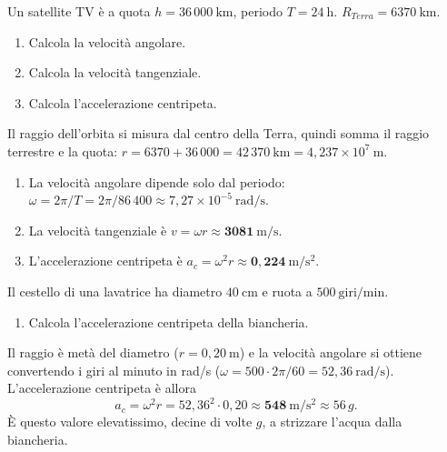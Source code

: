 \begin{question}[ID=1.6, subtitle={Satellite TV geostazionario a 36000 km di quota}, tags={moto circolare, satellite}, difficulty=media]
Un satellite TV è a quota $h = 36\,000\ \mathrm{km}$, periodo $T = 24\ \mathrm{h}$. $R_{Terra} = 6370\ \mathrm{km}$.
\begin{enumerate}
\item Calcola la velocità angolare.
\item Calcola la velocità tangenziale.
\item Calcola l'accelerazione centripeta.
\end{enumerate}
\begin{solution}
Il raggio dell'orbita si misura dal centro della Terra, quindi somma il raggio terrestre e la quota: $r = 6370 + 36\,000 = 42\,370\ \mathrm{km} = 4{,}237\times10^7\ \mathrm{m}$.
\begin{enumerate}
\item La velocità angolare dipende solo dal periodo: $\omega = 2\pi/T = 2\pi/86\,400 \approx 7{,}27\times10^{-5}\ \mathrm{rad/s}$.
\item La velocità tangenziale è $v = \omega r \approx \mathbf{3081\ \mathrm{m/s}}$.
\item L'accelerazione centripeta è $a_c = \omega^2 r \approx \mathbf{0{,}224\ \mathrm{m/s^2}}$.
\end{enumerate}
\end{solution}
\end{question}


\begin{question}[ID=1.7, subtitle={Lavatrice a 500 giri/min — accelerazione centripeta della biancheria}, tags={moto circolare}, difficulty=facile]
Il cestello di una lavatrice ha diametro $40\ \mathrm{cm}$ e ruota a $500\ \mathrm{giri/min}$.
\begin{enumerate}
\item Calcola l'accelerazione centripeta della biancheria.
\end{enumerate}
\begin{solution}
Il raggio è metà del diametro ($r = 0{,}20\ \mathrm{m}$) e la velocità angolare si ottiene convertendo i giri al minuto in rad/s ($\omega = 500\cdot 2\pi/60 = 52{,}36\ \mathrm{rad/s}$). L'accelerazione centripeta è allora
\[
a_c = \omega^2 r = 52{,}36^2\cdot 0{,}20 \approx \mathbf{548\ \mathrm{m/s^2}} \approx 56\,g.
\]
È questo valore elevatissimo, decine di volte $g$, a strizzare l'acqua dalla biancheria.
\end{solution}
\end{question}

